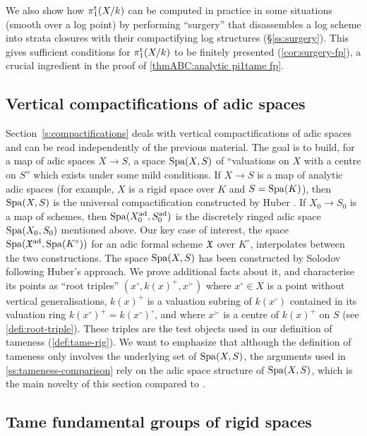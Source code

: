 \noindent 
We also show how $\pi_1^{\mathrm{t}}(X/k)$ can be computed in practice in some situations (smooth over a log point) by performing ``surgery'' that disassembles a log scheme into strata closures with their compactifying log structures (\S\ref{ss:surgery}). This gives sufficient conditions for $\pi_1^{\mathrm{t}}(X/k)$ to be finitely presented (\cref{cor:surgery-fp}), a crucial ingredient in the proof of \cref{thmABC:analytic pi1tame fp}. 

\subsection*{Vertical compactifications of adic spaces}

Section~\ref{s:compactifications} deals with vertical compactifications of adic spaces and can be read independently of the previous material. The goal is to build, for a map of adic spaces $X\to S$, a space $\operatorname{Spa}(X,S)$ of ``valuations on $X$ with a centre on $S$'' which exists under some mild conditions. If $X\to S$ is a map of analytic adic spaces (for example, $X$ is a rigid space over $K$ and $S=\operatorname{Spa}(K)$), then $\operatorname{Spa}(X,S)$ is the universal compactification constructed by Huber \cite[\S 5]{HuberBook}. If $X_0\to S_0$ is a map of schemes, then $\operatorname{Spa}(X_0^{\rm ad}, S_0^{\rm ad})$ is the discretely ringed adic space $\operatorname{Spa}(X_0,S_0)$ mentioned above. Our key case of interest, the space $\operatorname{Spa}({\mathfrak{X}}^{\rm ad}, \operatorname{Spa}(K^\circ))$ for an adic formal scheme ${\mathfrak{X}}$ over $K^\circ$, interpolates between the two constructions. The space $\operatorname{Spa}(X,S)$ has been constructed by Solodov \cite{Solodov-vertical-compactification} following Huber's approach. We prove additional facts about it, and characterise its points as ``root triples'' $(x^\circ, k(x)^+, x^\succ)$ where $x^\circ\in X$ is a point without vertical generalisations, $k(x)^+$ is a valuation subring of $k(x^\circ)$ contained in its valuation ring $k(x^\circ)^+=k(x^\circ)^\circ$, and where $x^\succ$ is a centre of $k(x)^+$ on $S$ (see \cref{defi:root-triple}). These triples are the test objects used in our definition of tameness (\cref{def:tame-rig}).
We want to emphasize that although the definition of tameness only involves the underlying set of $\operatorname{Spa}(X,S)$, the arguments used in \cref{ss:tameness-comparison} rely on the adic space structure of $\operatorname{Spa}(X,S)$, which is the main novelty of this section compared to \cite{Solodov-vertical-compactification}.

\subsection*{Tame fundamental groups of rigid spaces} 

